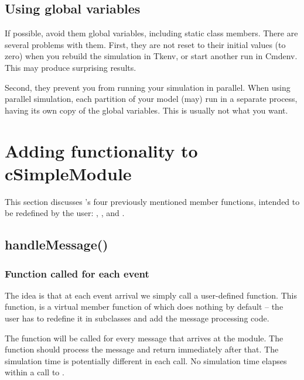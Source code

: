 \subsection{Using global variables}

If possible, avoid them global variables, including
static class members. There are several problems with them.
First, they are not reset to their initial values (to zero)
when you rebuild the simulation in Tkenv, or start another run
in Cmdenv. This may produce surprising results.

Second, they prevent you from running your simulation in parallel.
When using parallel simulation, each partition of your model
(may) run in a separate process, having its own copy of the
global variables. This is usually not what you want.




\section{Adding functionality to cSimpleModule}

This section discusses 's four previously
mentioned member functions, intended to be redefined by the user:
, , 
and .




\subsection{handleMessage()}

\subsubsection{Function called for each event}


The idea is that at each event arrival we simply call a
user-defined function. This function,
 is a
virtual member function of  which does
nothing by default -- the user has to redefine it in subclasses
and add the message processing code.

The  function will be called for every message
that arrives at the module. The function should process the message
and return immediately after that. The simulation time is potentially
different in each call. No simulation time elapses within a call
to .

